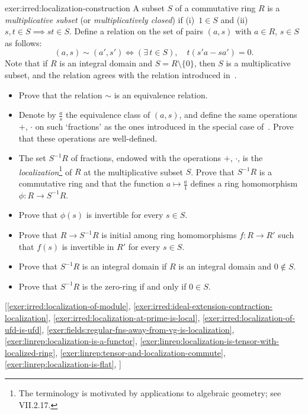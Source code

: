 \begin{exer}{}{exer:irred:localization-construction}
  \exerused{} A subset $S$ of a commutative ring $R$ is a
  \emph{multiplicative subset} (or \emph{multiplicatively closed}) if
  (i)~$1 \in S$ and (ii)~$s, t \in S \implies st \in S$. Define a
  relation on the set of pairs $(a, s)$ with $a \in R$, $s \in S$ as
  follows:
  \[(a, s) \sim (a', s') \iff (\exists\, t \in S),\quad t(s'a - sa') =
    0.\] Note that if $R$ is an integral domain and
  $S = R \setminus \{0\}$, then $S$ is a multiplicative subset, and
  the relation agrees with the relation introduced
  in~.
  \begin{itemize}
  \item Prove that the relation $\sim$ is an equivalence relation.
  \item Denote by $\frac{a}{s}$ the equivalence class of $(a,s)$, and
    define the same operations $+$, $\cdot$ on such `fractions' as the
    ones introduced in the special case
    of~. Prove
    that these operations are well-defined.
  \item The set $S^{-1}R$ of fractions, endowed with the operations
    $+$, $\cdot$, is the \emph{localization}\footnote{The terminology
      is motivated by applications to algebraic geometry; see
      VII.2.17.} of $R$ at the multiplicative subset $S$. Prove that
    $S^{-1}R$ is a commutative ring and that the function
    $a \mapsto \frac{a}{1}$ defines a ring homomorphism
    $\phi : R \to S^{-1}R$.
  \item Prove that $\phi(s)$ is invertible for every $s \in S$.
  \item Prove that $R \to S^{-1}R$ is initial among ring homomorphisms
    $f : R \to R'$ such that $f(s)$ is invertible in $R'$ for every
    $s \in S$.
  \item Prove that $S^{-1}R$ is an integral domain if $R$ is an
    integral domain and $0 \notin S$.
  \item Prove that $S^{-1}R$ is the zero-ring if and only if
    $0 \in S$.
  \end{itemize} [\ref{exer:irred:localization-of-module},
  \ref{exer:irred:ideal-extension-contraction-localization},
  \ref{exer:irred:localization-at-prime-is-local},
  \ref{exer:irred:localization-of-ufd-is-ufd},
  \ref{exer:fields:regular-fns-away-from-vg-is-localization},
  \ref{exer:linrep:localization-is-a-functor},
  \ref{exer:linrep:localization-is-tensor-with-localized-ring},
  \ref{exer:linrep:tensor-and-localization-commute},
  \ref{exer:linrep:localization-is-flat},
  ]
\end{exer}
